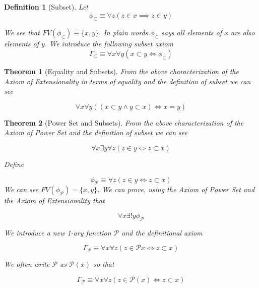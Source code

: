 \documentclass[12pt]{article}
\theoremstyle{break}
\newtheorem{definition}{Definition}[section]
\theoremstyle{break}
\newtheorem{theorem}{Theorem}[section]
\theoremstyle{break}
\theoremstyle{break}
\theoremstyle{break}
\newtheorem{informal definition}[definition]{Informal Definition}
\begin{document}
\begin{definition}[Subset]
Let
$$
\phi_{\subset} \equiv \forall z \left(z\in x \implies z \in y\right)
$$

We see that $FV(\phi_{\subset}) \equiv \{x, y\}$.
In plain words $\phi_\subset$ says all elements of $x$ are also elements of $y$.
We introduce the following subset axiom
$$
\Gamma_{\subset} \equiv \forall x \forall y (x\subset y \iff \phi_{\subset})
$$
\end{definition}

\begin{theorem}[Equality and Subsets]
From the above characterization of the Axiom of Extensionality in terms of equality and the definition of subset we can see

$$
\forall x \forall y \left((x\subset y \land y \subset x) \iff x = y \right)
$$
\end{theorem}

\begin{theorem}[Power Set and Subsets]
From the above characterization of the Axiom of Power Set and the definition of subset we can see

$$
\forall x \exists y \forall z(z\in y \iff z\subset x)
$$

Define

$$
\phi_{\mathcal{P}} \equiv \forall z (z\in y \iff z \subset x)
$$
We can see $FV(\phi_{\mathcal{P}}) = \{x, y\}$.
We can prove, using the Axiom of Power Set and the Axiom of Extensionality that

$$
\forall x \exists! y \phi_{\mathcal{P}}
$$

We introduce a new 1-ary function $\mathcal{P}$ and the definitional axiom

$$
\Gamma_{\mathcal{P}} \equiv \forall x \forall z(z\in \mathcal{P}x \iff z \subset x)
$$

We often write $\mathcal{P}$ as $\mathcal{P}(x)$ so that

$$
\Gamma_{\mathcal{P}} \equiv \forall x \forall z (z\in \mathcal{P}(x) \iff z \subset x)
$$

\end{theorem}
\end{document}
